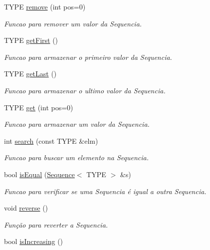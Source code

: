 \begin{DoxyCompactItemize}
T\+Y\+P\+E \hyperlink{classSequence_a041bb764297bfb85fe76a3fe21f80533}{remove} (int pos=0)
\begin{DoxyCompactList}\small\item\em Funcao para remover um valor da Sequencia. \end{DoxyCompactList}\item 
T\+Y\+P\+E \hyperlink{classSequence_ac53c75e455dc23747148bbc14f808a91}{get\+First} ()
\begin{DoxyCompactList}\small\item\em Funcao para armazenar o primeiro valor da Sequencia. \end{DoxyCompactList}\item 
T\+Y\+P\+E \hyperlink{classSequence_a25eacb0919853eab899ff5c687a0a26a}{get\+Last} ()
\begin{DoxyCompactList}\small\item\em Funcao para armazenar o ultimo valor da Sequencia. \end{DoxyCompactList}\item 
T\+Y\+P\+E \hyperlink{classSequence_a08130d1d69774ffbe0f8942121604b12}{get} (int pos=0)
\begin{DoxyCompactList}\small\item\em Funcao para armazenar um valor da Sequencia. \end{DoxyCompactList}\item 
int \hyperlink{classSequence_a52d217525d72abdca19e52c5f287734c}{search} (const T\+Y\+P\+E \&elm)
\begin{DoxyCompactList}\small\item\em Funcao para buscar um elemento na Sequencia. \end{DoxyCompactList}\item 
bool \hyperlink{classSequence_ae9b4b08e48aa47199a1db42dd983c294}{is\+Equal} (\hyperlink{classSequence}{Sequence}$<$ T\+Y\+P\+E $>$ \&s)
\begin{DoxyCompactList}\small\item\em Funcao para verificar se uma Sequencia é igual a outra Sequencia. \end{DoxyCompactList}\item 
void \hyperlink{classSequence_a377edb6182dd993d65d294f300033c19}{reverse} ()
\begin{DoxyCompactList}\small\item\em Função para reverter a Sequencia. \end{DoxyCompactList}\item 
bool \hyperlink{classSequence_abd3270106ceccc45db00c723ce8f00a8}{is\+Increasing} ()

\end{DoxyCompactItemize}
